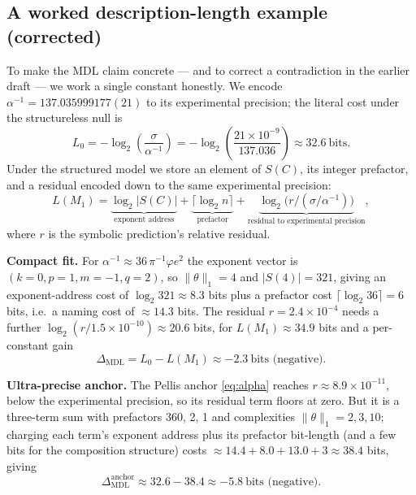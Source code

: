 \documentclass[11pt]{article}
\newcommand{\phigr}{\varphi}
\begin{document}
\subsection{A worked description-length example (corrected)}\label{sec:mdl}
To make the MDL claim concrete --- and to correct a contradiction in the earlier draft --- we work a single constant honestly. We encode $\alpha^{-1} = 137.035999177(21)$ to its experimental precision; the literal cost under the structureless null is
\begin{equation}
L_0 = -\log_2\!\left(\frac{\sigma}{\alpha^{-1}}\right) = -\log_2\!\left(\frac{21 \times 10^{-9}}{137.036}\right) \approx 32.6 \ \text{bits}. \label{eq:L0}
\end{equation}
Under the structured model we store an element of $S(C)$, its integer prefactor, and a residual encoded down to the same experimental precision:
\begin{equation}
L(M_1) = \underbrace{\log_2 |S(C)|}_{\text{exponent address}} + \underbrace{\lceil \log_2 n \rceil}_{\text{prefactor}} + \underbrace{\log_2\!\bigl(r/(\sigma/\alpha^{-1})\bigr)}_{\text{residual to experimental precision}}, \label{eq:LM1}
\end{equation}
where $r$ is the symbolic prediction's relative residual.

\noindent\textbf{Compact fit.} For $\alpha^{-1} \approx 36\,\pi^{-1}\phigr e^2$ the exponent vector is $(k{=}0, p{=}1, m{=}{-}1, q{=}2)$, so $\|\theta\|_1 = 4$ and $|S(4)| = 321$, giving an exponent-address cost of $\log_2 321 \approx 8.3$ bits plus a prefactor cost $\lceil \log_2 36 \rceil = 6$ bits, i.e.\ a naming cost of $\approx 14.3$ bits. The residual $r = 2.4 \times 10^{-4}$ needs a further $\log_2(r/1.5 \times 10^{-10}) \approx 20.6$ bits, for $L(M_1) \approx 34.9$ bits and a per-constant gain
\begin{equation}
\Delta_{\mathrm{MDL}} = L_0 - L(M_1) \approx -2.3 \ \text{bits (negative).} \label{eq:dmdl-compact}
\end{equation}

\noindent\textbf{Ultra-precise anchor.} The Pellis anchor \eqref{eq:alpha} reaches $r \approx 8.9 \times 10^{-11}$, below the experimental precision, so its residual term floors at zero. But it is a three-term sum with prefactors 360, 2, 1 and complexities $\|\theta\|_1 = 2, 3, 10$; charging each term's exponent address plus its prefactor bit-length (and a few bits for the composition structure) costs $\approx 14.4 + 8.0 + 13.0 + 3 \approx 38.4$ bits, giving
\begin{equation}
\Delta_{\mathrm{MDL}}^{\mathrm{anchor}} \approx 32.6 - 38.4 \approx -5.8 \ \text{bits (negative).} \label{eq:dmdl-anchor}
\end{equation}
\end{document}
